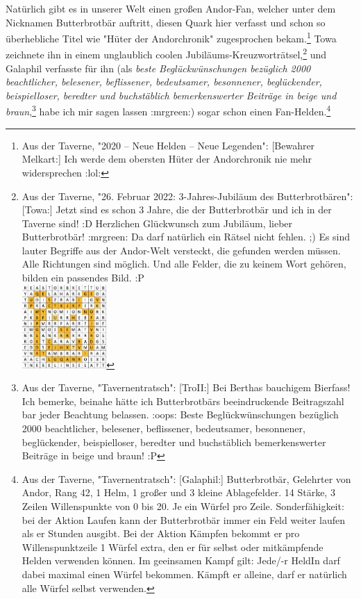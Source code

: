 \documentclass[10pt, a4paper, oneside]{book}
\begin{document}
{Natürlich gibt es in unserer Welt einen großen Andor-Fan, welcher unter dem Nicknamen Butterbrotbär auftritt, diesen Quark hier verfasst und schon so überhebliche Titel wie "Hüter der Andorchronik" zugesprochen bekam.\footnote{Aus der Taverne, "2020 – Neue Helden – Neue Legenden": [Bewahrer Melkart:] Ich werde dem obersten Hüter der Andorchronik nie mehr widersprechen :lol:} Towa zeichnete ihn in einem unglaublich coolen Jubiläums-Kreuzworträtsel,\footnote{Aus der Taverne, "26. Februar 2022: 3-Jahres-Jubiläum des Butterbrotbären": [Towa:] Jetzt sind es schon 3 Jahre, die der Butterbrotbär und ich in der Taverne sind! :D Herzlichen Glückwunsch zum Jubiläum, lieber Butterbrotbär! :mrgreen: Da darf natürlich ein Rätsel nicht fehlen. ;) Es sind lauter Begriffe aus der Andor-Welt versteckt, die gefunden werden müssen. Alle Richtungen sind möglich. Und alle Felder, die zu keinem Wort gehören, bilden ein passendes Bild. :P\\\includegraphics[height=120px]{Das Erbe des Wunderkindes/Bilder/Towa Raetsel BBB.jpg}} und Galaphil verfasste für ihn (als \textit{beste Beglückwünschungen bezüglich 2000 beachtlicher, belesener, beflissener, bedeutsamer, besonnener, beglückender, beispielloser, beredter und buchstäblich bemerkenswerter Beiträge in beige und braun},\footnote{Aus der Taverne, "Tavernentratsch": [TroII:] Bei Berthas bauchigem Bierfass! Ich bemerke, beinahe hätte ich Butterbrotbärs beeindruckende Beitragszahl bar jeder Beachtung belassen. :oops: Beste Beglückwünschungen bezüglich 2000 beachtlicher, belesener, beflissener, bedeutsamer, besonnener, beglückender, beispielloser, beredter und buchstäblich bemerkenswerter Beiträge in beige und braun! :P} habe ich mir sagen lassen :mrgreen:) sogar schon einen Fan-Helden.\footnote{Aus der Taverne, "Tavernentratsch": [Galaphil:] Butterbrotbär, Gelehrter von Andor, Rang 42, 1 Helm, 1 großer und 3 kleine Ablagefelder. 14 Stärke, 3 Zeilen Willenspunkte von 0 bis 20. Je ein Würfel pro Zeile. Sonderfähigkeit: bei der Aktion Laufen kann der Butterbrotbär immer ein Feld weiter laufen als er Stunden ausgibt. Bei der Aktion Kämpfen bekommt er pro Willenspunktzeile 1 Würfel extra, den er für selbst oder mitkämpfende Helden verwenden können. Im geeinsamen Kampf gilt: Jede/-r HeldIn darf dabei maximal einen Würfel bekommen. Kämpft er alleine, darf er natürlich alle Würfel selbst verwenden.}\bigskip

}
\end{document}
